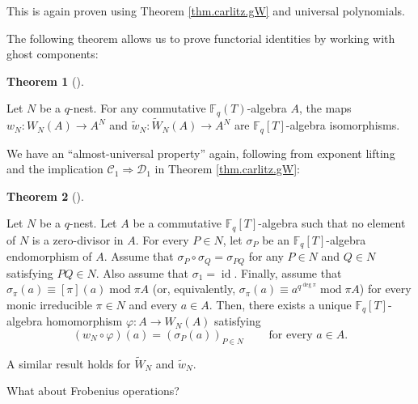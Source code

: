 \documentclass[numbers=enddot,12pt,final,onecolumn,notitlepage]{scrartcl}%
\theoremstyle{definition}
\newtheorem{theo}{Theorem}[section]
\newenvironment{theorem}[1][]
{\begin{theo}[#1]\begin{leftbar}}
{\end{leftbar}\end{theo}}
\begin{document}
This is again proven using Theorem \ref{thm.carlitz.gW} and universal polynomials.

The following theorem allows us to prove functorial identities by working with
ghost components:

\begin{theorem}
\label{thm.carlitz.Witt.iso}Let $N$ be a $q$-nest. For any commutative
$\mathbb{F}_{q}\left(  T\right)  $-algebra $A$, the maps $w_{N}:W_{N}\left(
A\right)  \rightarrow A^{N}$ and $\widetilde{w}_{N}:\widetilde{W}_{N}\left(
A\right)  \rightarrow A^{N}$ are $\mathbb{F}_{q}\left[  T\right]  $-algebra isomorphisms.
\end{theorem}

We have an ``almost-universal property'' again, following from exponent
lifting and the implication $\mathcal{C}_{1}\Longrightarrow\mathcal{D}_{1}$ in
Theorem \ref{thm.carlitz.gW}:

\begin{theorem}
\label{thm.carlitz.Witt.frob.au}Let $N$ be a $q$-nest. Let $A$ be a
commutative $\mathbb{F}_{q}\left[  T\right]  $-algebra such that no element of
$N$ is a zero-divisor in $A$. For every $P\in N$, let $\sigma_{P}$ be an
$\mathbb{F}_{q}\left[  T\right]  $-algebra endomorphism of $A$. Assume that
$\sigma_{P}\circ\sigma_{Q}=\sigma_{PQ}$ for any $P\in N$ and $Q\in N$
satisfying $PQ\in N$. Also assume that $\sigma_{1}=\operatorname*{id}$.
Finally, assume that $\sigma_{\pi}\left(  a\right)  \equiv\left[  \pi\right]
\left(  a\right)  \operatorname{mod}\pi A$ (or, equivalently, $\sigma_{\pi
}\left(  a\right)  \equiv a^{q^{\deg\pi}}\operatorname{mod}\pi A$) for every
monic irreducible $\pi\in N$ and every $a\in A$. Then, there exists a unique
$\mathbb{F}_{q}\left[  T\right]  $-algebra homomorphism $\varphi:A\rightarrow
W_{N}\left(  A\right)  $ satisfying%
\begin{equation}
\left(  w_{N}\circ\varphi\right)  \left(  a\right)  =\left(  \sigma_{P}\left(
a\right)  \right)  _{P\in N}\ \ \ \ \ \ \ \ \ \ \text{for every }a\in A.
\label{eq.thm.carlitz.Witt.frob.au.phi}%
\end{equation}

\end{theorem}

A similar result holds for $\widetilde{W}_{N}$ and $\widetilde{w}_{N}$.

What about Frobenius operations?
\end{document}

